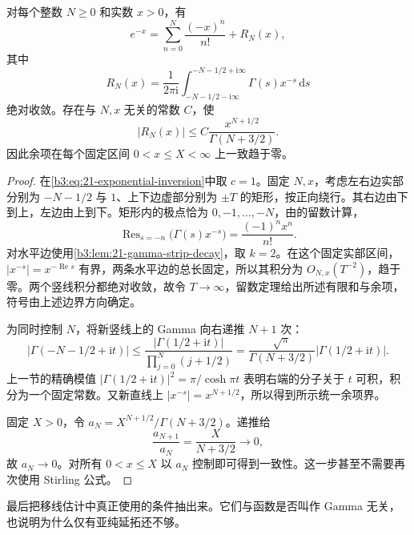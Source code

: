 \begin{proposition}[指数函数反演的移线余项]\label{b3:prop:21-exponential-contour}
对每个整数 \(N\ge0\) 和实数 \(x>0\)，有
\[
 e^{-x}=\sum_{n=0}^N\frac{(-x)^n}{n!}+R_N(x),
\]
其中
\begin{equation}\label{b3:eq:21-exponential-remainder}
 R_N(x)=\frac1{2\pi\mathrm i}
       \int_{-N-1/2-\mathrm i\infty}^{-N-1/2+\mathrm i\infty}
                    \Gamma(s)x^{-s}\,\mathrm ds
\end{equation}
绝对收敛。存在与 \(N,x\) 无关的常数 \(C\)，使
\[
 |R_N(x)|\le C\frac{x^{N+1/2}}{\Gamma(N+3/2)}.
\]
因此余项在每个固定区间 \(0<x\le X<\infty\) 上一致趋于零。
\end{proposition}
\begin{proof}
在\eqref{b3:eq:21-exponential-inversion}中取 \(c=1\)。固定 \(N,x\)，考虑左右边实部分别为 \(-N-1/2\) 与 \(1\)、上下边虚部分别为 \(\pm T\) 的矩形，按正向绕行。其右边由下到上，左边由上到下。矩形内的极点恰为 \(0,-1,\ldots,-N\)，由的留数计算，
\[
 \operatorname{Res}_{s=-n}\bigl(\Gamma(s)x^{-s}\bigr)
 =\frac{(-1)^nx^n}{n!}.
\]
对水平边使用\cref{b3:lem:21-gamma-strip-decay}，取 \(k=2\)。在这个固定实部区间，\(|x^{-s}|=x^{-\operatorname{Re}s}\) 有界，两条水平边的总长固定，所以其积分为 \(O_{N,x}(T^{-2})\)，趋于零。两个竖线积分都绝对收敛，故令 \(T\to\infty\)，留数定理给出所述有限和与余项，符号由上述边界方向确定。

为同时控制 \(N\)，将新竖线上的 Gamma 向右递推 \(N+1\) 次：
\[
 |\Gamma(-N-1/2+\mathrm it)|
 \le\frac{|\Gamma(1/2+\mathrm it)|}
              {\prod_{j=0}^N(j+1/2)}
 =\frac{\sqrt\pi}{\Gamma(N+3/2)}
                         |\Gamma(1/2+\mathrm it)|.
\]
上一节的精确模值 \(|\Gamma(1/2+\mathrm it)|^2=\pi/\cosh\pi t\) 表明右端的分子关于 \(t\) 可积，积分为一个固定常数。又新直线上 \(|x^{-s}|=x^{N+1/2}\)，所以得到所示统一余项界。

固定 \(X>0\)，令 \(a_N=X^{N+1/2}/\Gamma(N+3/2)\)。递推给
\[
 \frac{a_{N+1}}{a_N}=\frac{X}{N+3/2}\longrightarrow0,
\]
故 \(a_N\to0\)。对所有 \(0<x\le X\) 以 \(a_N\) 控制即可得到一致性。这一步甚至不需要再次使用 Stirling 公式。
\end{proof}

最后把移线估计中真正使用的条件抽出来。它们与函数是否叫作 Gamma 无关，也说明为什么仅有亚纯延拓还不够。

